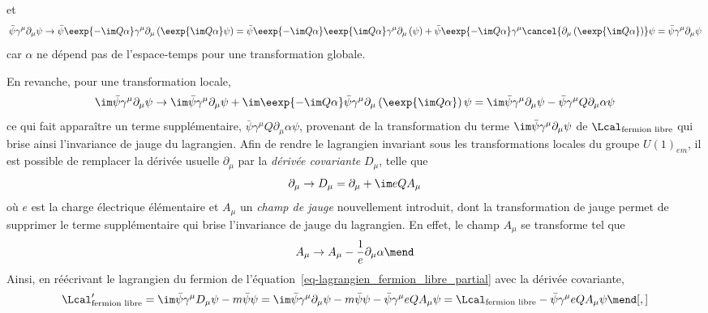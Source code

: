 et
\begin{equation}
\bar{\psi} \gamma^\mu\partial_\mu \psi
\to
\bar{\psi}\eexp{-\im Q\alpha}
\gamma^\mu\partial_\mu
\left(\eexp{\im Q\alpha}\psi\right)
=
\bar{\psi}\eexp{-\im Q\alpha}
\eexp{\im Q\alpha}
\gamma^\mu\partial_\mu
\left(\psi\vphantom{\psi\eexp{\im Q\alpha}}\right)
+
\bar{\psi}\eexp{-\im Q\alpha}
\gamma^\mu
\cancel{\partial_\mu \left(\eexp{\im Q\alpha}\vphantom{\psi\eexp{\im Q\alpha}}\right)}\psi
= \bar{\psi} \gamma^\mu\partial_\mu \psi
\end{equation}
car $\alpha$ ne dépend pas de l'espace-temps pour une transformation globale.
\par En revanche, pour une transformation locale, %
\begin{equation}
\im\bar{\psi} \gamma^\mu\partial_\mu \psi
\to
\im\bar{\psi} \gamma^\mu\partial_\mu \psi
+
\im\eexp{-\im Q\alpha}
\bar{\psi}
\gamma^\mu
\partial_\mu
\left(\eexp{\im Q\alpha}\vphantom{\psi\eexp{\im Q\alpha}}\right)
\psi
=
\im\bar{\psi} \gamma^\mu\partial_\mu \psi
-
\bar{\psi}
\gamma^\mu
Q\partial_\mu
\alpha
\psi
\label{eq-QED_jauge_brisee}
\end{equation}
ce qui fait apparaître un terme supplémentaire, $\bar{\psi}\gamma^\mu Q\partial_\mu\alpha\psi$, provenant de la transformation du terme $\im \bar{\psi} \gamma^\mu\partial_\mu \psi$ de $\Lcal_{\text{fermion libre}}$ qui brise ainsi l'invariance de jauge du lagrangien.
Afin de rendre le lagrangien invariant sous les transformations locales du groupe $U(1)_{em}$, il est possible de remplacer la dérivée usuelle $\partial_\mu$ par la \emph{dérivée covariante} $D_\mu$, telle que
\begin{equation}
\partial_\mu \to D_\mu = \partial_\mu + \im eQ A_\mu
\end{equation}
où $e$ est la charge électrique élémentaire et $A_\mu$ un \emph{champ de jauge} nouvellement introduit, dont la transformation de jauge permet de supprimer le terme supplémentaire qui brise l'invariance de jauge du lagrangien. En effet, le champ $A_\mu$ se transforme tel que
\begin{equation}
A_\mu \to A_\mu - \frac{1}{e} \partial_\mu\alpha
\mend
\end{equation}
Ainsi, en réécrivant le lagrangien du fermion de l'équation~\eqref{eq-lagrangien_fermion_libre_partial} avec la dérivée covariante,
\begin{equation}
\Lcal_{\text{fermion libre}}' = \im \bar{\psi} \gamma^\mu D_\mu \psi - m \bar{\psi}\psi
= \im \bar{\psi} \gamma^\mu\partial_\mu \psi - m \bar{\psi}\psi - \bar{\psi}\gamma^\mu eQA_\mu \psi
= \Lcal_{\text{fermion libre}} - \bar{\psi}\gamma^\mu eQA_\mu \psi
\mend[,]
\end{equation}
